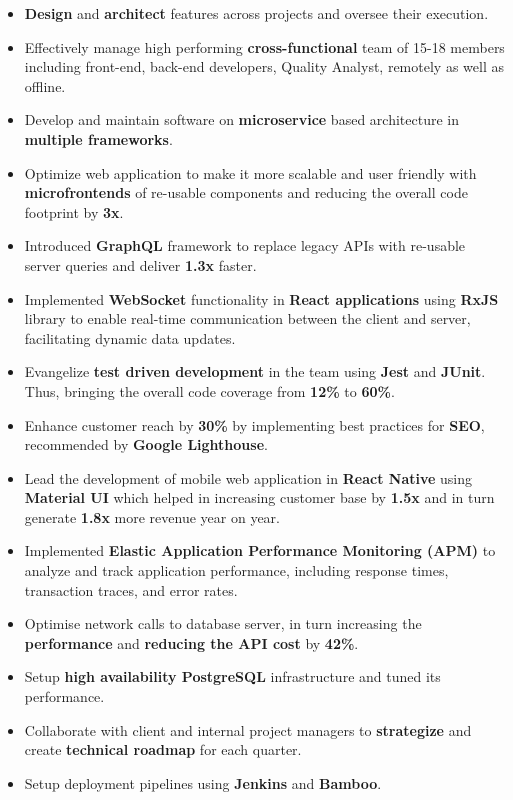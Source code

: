 \documentclass[10pt,a4paper,ragged2e,withhyper]{altacv}
\begin{document}
\begin{paracol}{2}
\begin{itemize}
\item \textbf{Design} and \textbf{architect} features across projects and oversee their execution.
\item Effectively manage high performing \textbf{cross-functional} team of 15-18 members including front-end, back-end developers, Quality Analyst, remotely as well as offline.
\item Develop and maintain software on \textbf{microservice} based architecture in \textbf{multiple frameworks}.
\item Optimize web application to make it more scalable and user friendly with \textbf{microfrontends} of re-usable components and reducing the overall code footprint by \textbf{3x}.
\item Introduced \textbf{GraphQL} framework to replace legacy APIs with re-usable server queries and deliver \textbf{1.3x} faster.
\item Implemented \textbf{WebSocket} functionality in \textbf{React applications} using \textbf{RxJS} library to enable real-time communication between the client and server, facilitating dynamic data updates.
\item Evangelize \textbf{test driven development} in the team using \textbf{Jest} and \textbf{JUnit}. Thus, bringing the overall code coverage from \textbf{12\%} to \textbf{60\%}.
\item Enhance customer reach by \textbf{30\%} by implementing best practices for \textbf{SEO}, recommended by \textbf{Google Lighthouse}.
\item Lead the development of mobile web application in \textbf{React Native} using \textbf{Material UI} which helped in increasing customer base by \textbf{1.5x} and in turn generate \textbf{1.8x} more revenue year on year.
\item Implemented \textbf{Elastic Application Performance Monitoring (APM)} to analyze and track application performance, including response times, transaction traces, and error rates.
\item Optimise network calls to database server, in turn increasing the \textbf{performance} and \textbf{reducing the API cost} by \textbf{42\%}.
\item Setup \textbf{high availability PostgreSQL} infrastructure and tuned its performance.
\item Collaborate with client and internal project managers to \textbf{strategize} and create \textbf{technical roadmap} for each quarter.
\item Setup deployment pipelines using \textbf{Jenkins} and \textbf{Bamboo}.

\end{itemize}
\end{paracol}
\end{document}

